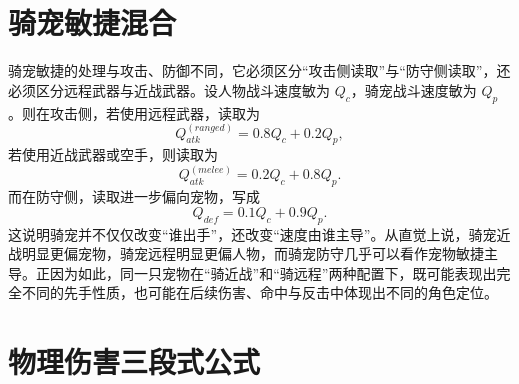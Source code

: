 \section{骑宠敏捷混合}

骑宠敏捷的处理与攻击、防御不同，它必须区分“攻击侧读取”与“防守侧读取”，还必须区分远程武器与近战武器。设人物战斗速度敏为 $Q_c$，骑宠战斗速度敏为 $Q_p$。则在攻击侧，若使用远程武器，读取为
\begin{equation}
    Q_{atk}^{(ranged)} = 0.8Q_c + 0.2Q_p,
    \label{eq:ride-quick-ranged}
\end{equation}
若使用近战武器或空手，则读取为
\begin{equation}
    Q_{atk}^{(melee)} = 0.2Q_c + 0.8Q_p.
    \label{eq:ride-quick-melee}
\end{equation}
而在防守侧，读取进一步偏向宠物，写成
\begin{equation}
    Q_{def} = 0.1Q_c + 0.9Q_p.
    \label{eq:ride-quick-def}
\end{equation}
这说明骑宠并不仅仅改变“谁出手”，还改变“速度由谁主导”。从直觉上说，骑宠近战明显更偏宠物，骑宠远程明显更偏人物，而骑宠防守几乎可以看作宠物敏捷主导。正因为如此，同一只宠物在“骑近战”和“骑远程”两种配置下，既可能表现出完全不同的先手性质，也可能在后续伤害、命中与反击中体现出不同的角色定位。

\section{物理伤害三段式公式}

